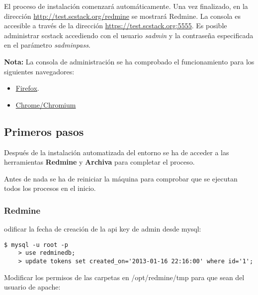 \par El proceso de instalación comenzará automáticamente. Una vez finalizado, en la dirección
\href{http://test.scstack.org/redmine}{http://test.scstack.org/redmine} se mostrará Redmine. La consola es accesible a través de la dirección \href{https://test.scstack.org:5555}{https://test.scstack.org:5555}. Es posible administrar scstack accediendo con el usuario \emph{sadmin} y la contraseña especificada en el parámetro \emph{sadminpass}.

\par \textbf{Nota:} La consola de administración se ha comprobado el funcionamiento para los siguientes navegadores:

\begin{itemize}
	\item \href{http://www.mozilla.org/es-ES/firefox/new/}{Firefox}.
	\item \href{https://www.google.com/intl/es/chrome/browser/?hl=es}{Chrome/Chromium}

\end{itemize}

\subsection{Primeros pasos}
\label{sub:primeros-pasos}

\par Después de la instalación automatizada del entorno se ha de acceder a las herramientas \textbf{Redmine} y \textbf{Archiva} para completar el proceso.

\par Antes de nada se ha de reiniciar la máquina para comprobar que se ejecutan todos los procesos en el inicio.

\subsubsection{Redmine}
\label{subs:conf-redmine}

\par odificar la fecha de creación de la api key de admin desde mysql:

\lstset{style=bashbasico}
\begin{lstlisting}[frame=trbl]
    $ mysql -u root -p
    > use redminedb;
    > update tokens set created_on='2013-01-16 22:16:00' where id='1';
\end{lstlisting}

\par Modificar los permisos de las carpetas en /opt/redmine/tmp para que sean del usuario de apache:


